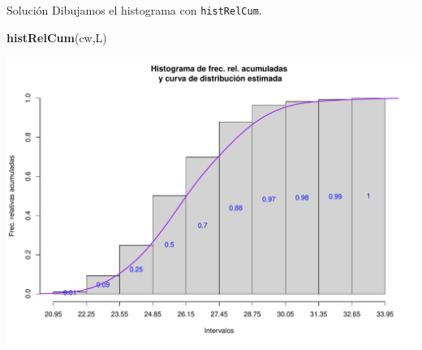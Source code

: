 \documentclass[
  ignorenonframetext,
]{beamer}
\newenvironment{Shaded}{\begin{snugshade}}{\end{snugshade}}
\newcommand{\FunctionTok}[1]{\textcolor[rgb]{0.13,0.29,0.53}{\textbf{#1}}}
\newcommand{\NormalTok}[1]{#1}
\begin{document}
\begin{frame}[fragile]{Solución}
\label{soluciuxf3n-47}
Dibujamos el histograma con \texttt{histRelCum}.

\begin{Shaded}
\begin{Highlighting}[]
\FunctionTok{histRelCum}\NormalTok{(cw,L)}
\end{Highlighting}
\end{Shaded}

\includegraphics{R_base_files/figure-beamer/unnamed-chunk-254-1.pdf}
\end{frame}
\end{document}
